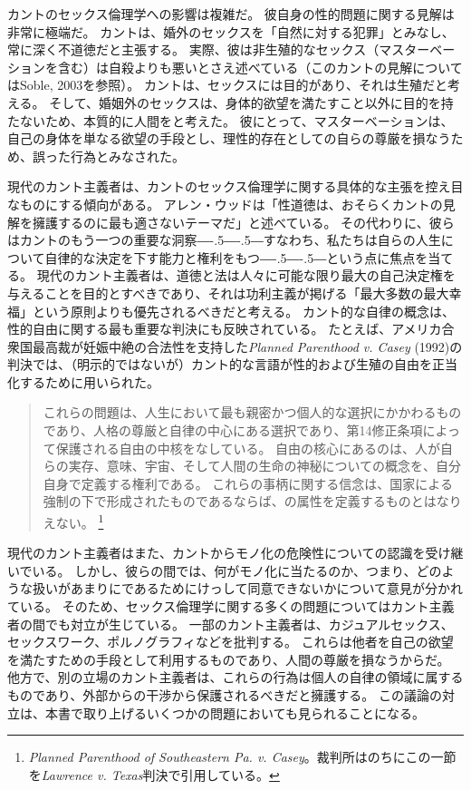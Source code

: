 \documentclass[paper=a4,book,openany]{jlreq}
\def\DDASH{―\kern-.5\zw―\kern-.5\zw―} %
\begin{document}
カントのセックス倫理学への影響は複雑だ\citep[]{herman02:_could_it_be_worth_think}。
彼自身の性的問題に関する見解は非常に極端だ。
カントは、婚外のセックスを「自然に対する犯罪」とみなし、常に深く不道徳だと主張する。
実際、彼は非生殖的なセックス（マスターベーションを含む）は自殺よりも悪いとさえ述べている（このカントの見解についてはSoble, 2003\nocite{soble03:_kant_sexual_perver}を参照）。
カントは、セックスには目的があり、それは生殖だと考える。
そして、婚姻外のセックスは、身体的欲望を満たすこと以外に目的を持たないため、本質的に人間をと考えた。
彼にとって、マスターベーションは、自己の身体を単なる欲望の手段とし、理性的存在としての自らの尊厳を損なうため、誤った行為とみなされた。

現代のカント主義者は、カントのセックス倫理学に関する具体的な主張を控え目なものにする傾向がある。
アレン・ウッドは「性道徳は、おそらくカントの見解を擁護するのに最も適さないテーマだ」と述べている\citep[p.224]{wood08:_kantian_ethic}。
その代わりに、彼らはカントのもう一つの重要な洞察{\DDASH}すなわち、私たちは自らの人生について自律的な決定を下す能力と権利をもつ{\DDASH}という点に焦点を当てる。
現代のカント主義者は、道徳と法は人々に可能な限り最大の自己決定権を与えることを目的とすべきであり、それは功利主義が掲げる「最大多数の最大幸福」という原則よりも優先されるべきだと考える。
カント的な自律の概念は、性的自由に関する最も重要な判決にも反映されている。
たとえば、アメリカ合衆国最高裁が妊娠中絶の合法性を支持した\emph{Planned Parenthood v. Casey} (1992)の判決では、（明示的ではないが）カント的な言語が性的および生殖の自由を正当化するために用いられた。

\begin{quote}
これらの問題は、人生において最も親密かつ個人的な選択にかかわるものであり、人格の尊厳と自律の中心にある選択であり、第14修正条項によって保護される自由の中核をなしている。
自由の核心にあるのは、人が自らの実存、意味、宇宙、そして人間の生命の神秘についての概念を、自分自身で定義する権利である。
これらの事柄に関する信念は、国家による強制の下で形成されたものであるならば、の属性を定義するものとはなりえない。
\footnote{\emph{Planned Parenthood of Southeastern Pa. v. Casey}。裁判所はのちにこの一節を\emph{Lawrence v. Texas}判決で引用している。}
\end{quote}

現代のカント主義者はまた、カントからモノ化の危険性についての認識を受け継いでいる。
しかし、彼らの間では、何がモノ化に当たるのか、つまり、どのような扱いがあまりにであるためにけっして同意できないかについて意見が分かれている。
そのため、セックス倫理学に関する多くの問題についてはカント主義者の間でも対立が生じている。
一部のカント主義者は、カジュアルセックス、セックスワーク、ポルノグラフィなどを批判する。
これらは他者を自己の欲望を満たすための手段として利用するものであり、人間の尊厳を損なうからだ。
他方で、別の立場のカント主義者は、これらの行為は個人の自律の領域に属するものであり、外部からの干渉から保護されるべきだと擁護する。
この議論の対立は、本書で取り上げるいくつかの問題においても見られることになる。
\end{document}
